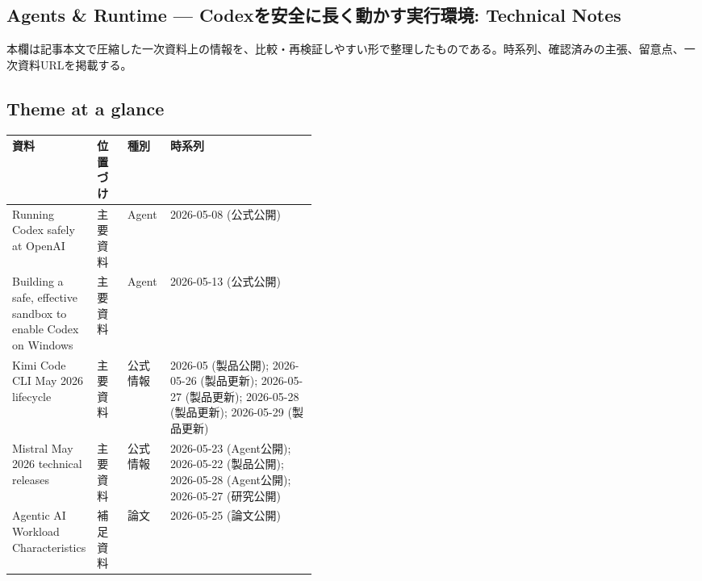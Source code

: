 \subsection*{Agents \& Runtime — Codexを安全に長く動かす実行環境: Technical Notes}
本欄は記事本文で圧縮した一次資料上の情報を、比較・再検証しやすい形で整理したものである。時系列、確認済みの主張、留意点、一次資料URLを掲載する。
\medskip
\subsection*{Theme at a glance}
\begin{center}
\footnotesize
\begin{tabularx}{\linewidth}{@{}p{0.20\linewidth}p{0.10\linewidth}p{0.14\linewidth}X@{}}
\toprule
資料 & 位置づけ & 種別 & 時系列 \\
\midrule
Running Codex safely at OpenAI & 主要資料 & Agent & 2026-05-08 (公式公開) \\
Building a safe, effective sandbox to enable Codex on Windows & 主要資料 & Agent & 2026-05-13 (公式公開) \\
Kimi Code CLI May 2026 lifecycle & 主要資料 & 公式情報 & 2026-05 (製品公開); 2026-05-26 (製品更新); 2026-05-27 (製品更新); 2026-05-28 (製品更新); 2026-05-29 (製品更新) \\
Mistral May 2026 technical releases & 主要資料 & 公式情報 & 2026-05-23 (Agent公開); 2026-05-22 (製品公開); 2026-05-28 (Agent公開); 2026-05-27 (研究公開) \\
Agentic AI Workload Characteristics & 補足資料 & 論文 & 2026-05-25 (論文公開) \\
\bottomrule
\end{tabularx}
\end{center}
\normalsize

